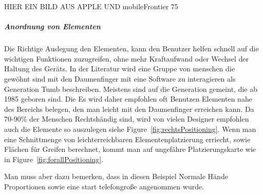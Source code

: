 HIER EIN BILD AUS APPLE UND mobileFrontier 75

\subparagraph{Anordnung von Elementen} 
\label{subp:anordnung_von_elementen}

Die Richtige Auslegung den Elementen, kann den Benutzer helfen schnell auf die wichtigen Funktionen zuzugreifen, ohne mehr Kraftaufwand oder Wechsel der Haltung des Geräts. In der Literatur wird eine Gruppe von menschen die gewöhnt sind mit den Daumenfinger mit eine Software zu interagieren als Generation Tumb beschreiben. Meistens sind auf die Generation gemeint, die ab 1985 geboren sind. Die  Es wird daher empfohlen oft Benutzen Elementen nahe des Bereichs belegen, den man leicht mit den Daumenfinger erreichen kann. Da 70-90\% der Menschen  Rechtshändig sind, wird von vielen Designer empfohlen auch die Elemente so auszulegen siehe Figure~\ref{fig:rechtsPositioning}. Wenn man eine Schnittmenge von leichterreichbaren Elementenplatzierung erriecht, sowie Flächen für Greifen berechnet, kommt man auf ungefähre Platzierungskarte wie in Figure~\ref{fig:forallPositioning}. 

Man muss aber dazu bemerken, dass in diesen Beispiel Normale Hände Proportionen sowie eine start telefongroße angenommen wurde.


